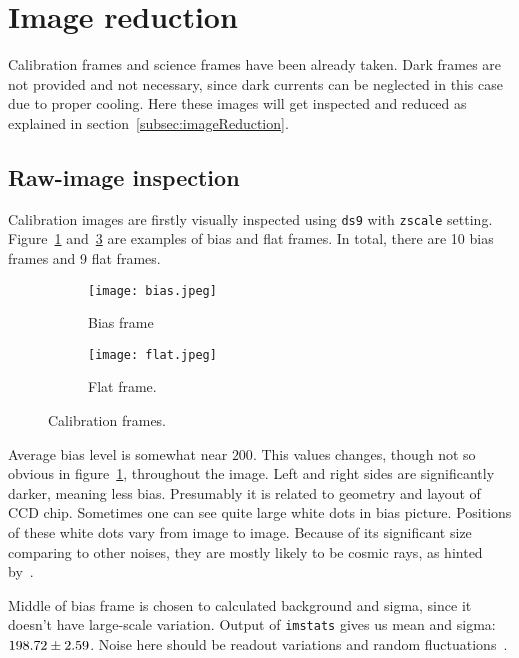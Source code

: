 \clearpage
\section{Image reduction}
Calibration frames and science frames have been already taken. Dark frames are not provided and not necessary, since dark currents can be neglected in this case due to proper cooling. Here these images will get inspected and reduced as explained in section~\ref{subsec:imageReduction}.
\subsection{Raw-image inspection}
Calibration images are firstly visually inspected using \verb|ds9| with \verb|zscale| setting. Figure~\ref{fig:bias} and~\ref{fig:flat} are examples of bias and flat frames. In total, there are 10 bias frames and 9 flat frames.
\begin{figure}[H]
   \centering
   \begin{subfigure}[b]{0.5\textwidth}
   \begin{center}
   \texttt{[image: bias.jpeg]}
   \end{center}
   \caption{Bias frame}
   \label{fig:bias}
   \end{subfigure}%
   \begin{subfigure}[b]{0.5\textwidth}
   \begin{center}
   \texttt{[image: flat.jpeg]}
   \end{center}
	\caption{Flat frame.}
   \label{fig:flat}
   \end{subfigure}
	\caption{Calibration frames. }%
\end{figure}

Average bias level is somewhat near $200$. This values changes, though not so obvious in figure~\ref{fig:bias}, throughout the image. Left and right sides are significantly darker, meaning less bias. Presumably it is related to geometry and layout of CCD chip. Sometimes one can see quite large white dots in bias picture. Positions of these white dots vary from image to image. Because of its significant size comparing to other noises, they are mostly likely to be cosmic rays, as hinted by~\cite{manual}.

Middle of bias frame is chosen to calculated background and sigma, since it doesn't have large-scale variation. Output of \verb|imstats| gives us mean and sigma: $\num{198.72 +- 2.59}$. Noise here should be readout variations and random fluctuations~\cite{manual}.

